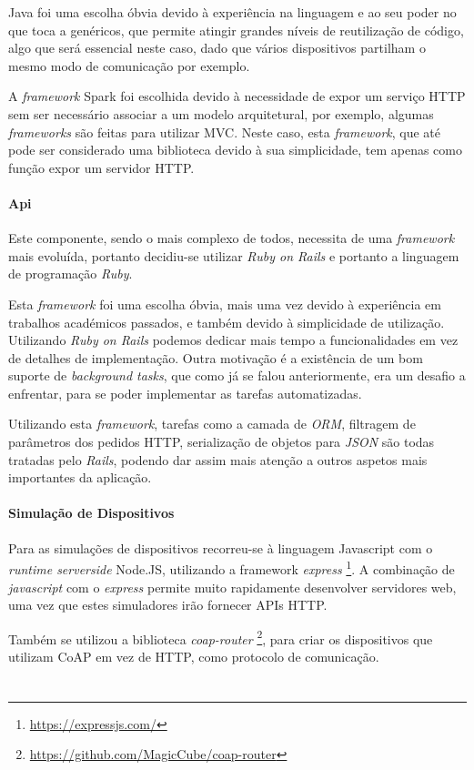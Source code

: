 Java foi uma escolha óbvia devido à experiência na linguagem e ao seu poder no que toca a genéricos, que permite atingir grandes níveis de reutilização de código, algo que será essencial neste caso, dado que vários dispositivos partilham o mesmo modo de comunicação por exemplo. 

A \textit{framework} Spark foi escolhida devido à necessidade de expor um serviço HTTP sem ser necessário associar a um modelo arquitetural, por exemplo, algumas \textit{frameworks} são feitas para utilizar MVC. Neste caso, esta \textit{framework}, que até pode ser considerado uma biblioteca devido à sua simplicidade, tem apenas como função expor um servidor HTTP.

\paragraph*{Api}
Este componente, sendo o mais complexo de todos, necessita de uma \textit{framework} mais evoluída, portanto decidiu-se utilizar \textit{Ruby on Rails} e portanto a linguagem de programação \textit{Ruby}.

Esta \textit{framework} foi uma escolha óbvia, mais uma vez devido à experiência em trabalhos académicos passados, e também devido à simplicidade de utilização. Utilizando \textit{Ruby on Rails} podemos dedicar mais tempo a funcionalidades em vez de detalhes de implementação. Outra motivação é a existência de um bom suporte de \textit{background tasks}, que como já se falou anteriormente, era um desafio a enfrentar, para se poder implementar as tarefas automatizadas.

Utilizando esta \textit{framework}, tarefas como a camada de \textit{ORM}, filtragem de parâmetros dos pedidos HTTP, serialização de objetos para \textit{JSON} são todas tratadas pelo \textit{Rails}, podendo dar assim mais atenção a outros aspetos mais importantes da aplicação.

\paragraph*{Simulação de Dispositivos}

Para as simulações de dispositivos recorreu-se à linguagem Javascript com o \textit{runtime serverside} Node.JS, utilizando a framework \textit{express} \footnote{\url{https://expressjs.com/}}. A combinação de \textit{javascript} com o \textit{express} permite muito rapidamente desenvolver servidores web, uma vez que estes simuladores irão fornecer APIs HTTP. 

Também se utilizou a biblioteca \textit{coap-router} \footnote{\url{https://github.com/MagicCube/coap-router}}, para criar os dispositivos que utilizam CoAP em vez de HTTP, como protocolo de comunicação.

\section{}